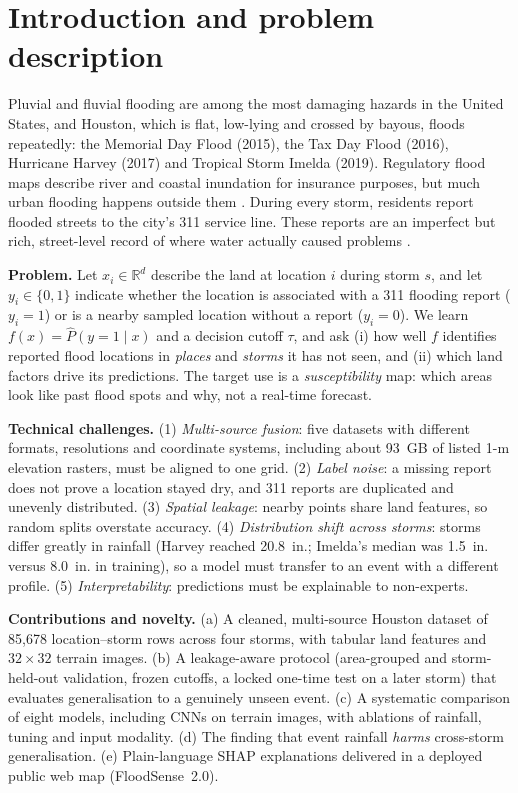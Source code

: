 \documentclass{article}
\begin{document}
\section{Introduction and problem description}
Pluvial and fluvial flooding are among the most damaging hazards in the United States, and Houston, which is flat, low-lying and crossed by bayous, floods repeatedly: the Memorial Day Flood (2015), the Tax Day Flood (2016), Hurricane Harvey (2017) and Tropical Storm Imelda (2019). Regulatory flood maps describe river and coastal inundation for insurance purposes, but much urban flooding happens outside them \cite{mobley2021texas}. During every storm, residents report flooded streets to the city's 311 service line. These reports are an imperfect but rich, street-level record of where water actually caused problems \cite{agonafir2022nyc311,liu2024interpretable}.

\textbf{Problem.} Let $x_i\in\mathbb{R}^d$ describe the land at location $i$ during storm $s$, and let $y_i\in\{0,1\}$ indicate whether the location is associated with a 311 flooding report ($y_i=1$) or is a nearby sampled location without a report ($y_i=0$). We learn $f(x)=\hat P(y=1\mid x)$ and a decision cutoff $\tau$, and ask (i) how well $f$ identifies reported flood locations in \emph{places} and \emph{storms} it has not seen, and (ii) which land factors drive its predictions. The target use is a \emph{susceptibility} map: which areas look like past flood spots and why, not a real-time forecast.

\textbf{Technical challenges.} (1) \emph{Multi-source fusion}: five datasets with different formats, resolutions and coordinate systems, including about 93~GB of listed 1-m elevation rasters, must be aligned to one grid. (2) \emph{Label noise}: a missing report does not prove a location stayed dry, and 311 reports are duplicated and unevenly distributed. (3) \emph{Spatial leakage}: nearby points share land features, so random splits overstate accuracy. (4) \emph{Distribution shift across storms}: storms differ greatly in rainfall (Harvey reached 20.8~in.; Imelda's median was 1.5~in. versus 8.0~in. in training), so a model must transfer to an event with a different profile. (5) \emph{Interpretability}: predictions must be explainable to non-experts.

\textbf{Contributions and novelty.} (a) A cleaned, multi-source Houston dataset of 85,678 location--storm rows across four storms, with tabular land features and $32\times32$ terrain images. (b) A leakage-aware protocol (area-grouped and storm-held-out validation, frozen cutoffs, a locked one-time test on a later storm) that evaluates generalisation to a genuinely unseen event. (c) A systematic comparison of eight models, including CNNs on terrain images, with ablations of rainfall, tuning and input modality. (d) The finding that event rainfall \emph{harms} cross-storm generalisation. (e) Plain-language SHAP explanations delivered in a deployed public web map (FloodSense~2.0).
\end{document}
